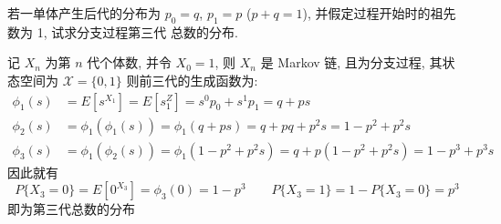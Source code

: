 \documentclass[boxes]{homework}
\begin{document}
\begin{problem}
若一单体产生后代的分布为 $p_0 = q$, $p_1 = p$ ($p + q = 1$), 并假定过程开始时的祖先数为 1, 试求分支过程第三代
总数的分布.
\end{problem}
\begin{solution}
    记 $X_n$ 为第 $n$ 代个体数, 并令 $X_0 = 1$, 则 $X_n$ 是 Markov 链, 且为分支过程, 其状态空间为
    $\mathcal{X} = \{0, 1\}$
    则前三代的生成函数为:
    \begin{align}
        \phi_1(s) & = E\left[s^{X_1}\right] = E\left[s^Z_1\right] = s^0p_0 + s^1p_1 = q + ps  \\
        \phi_2(s) & = \phi_1(\phi_1(s)) = \phi_1(q + ps) = q + pq + p^2 s = 1 - p^2 + p^2 s \\
        \phi_3(s) & = \phi_1(\phi_2(s)) = \phi_1(1 - p^2 + p^2 s) = q + p(1 - p^2 + p^2 s)
        = 1 - p^3 + p^3 s
    \end{align}
    因此就有
    \begin{equation}
        P\{X_3 = 0\} = E\left[0^{X_3}\right] = \phi_3(0) = 1 - p^3
        \qquad P\{X_3 = 1\} = 1 - P\{X_3 = 0\} = p^3
    \end{equation}
    即为第三代总数的分布
\end{solution}
\end{document}
